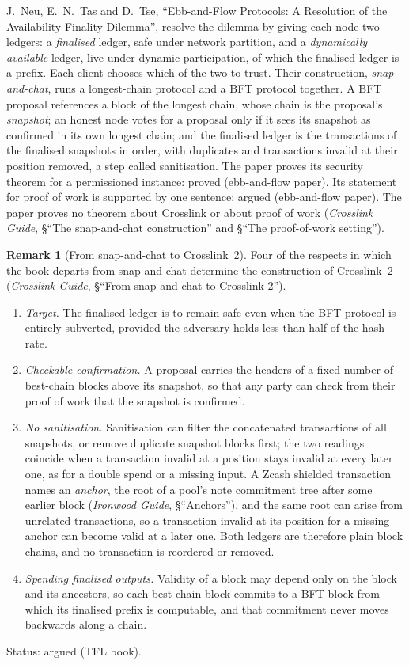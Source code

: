 \documentclass[11pt,a4paper]{article}
\theoremstyle{definition}
\newtheorem{remark}[theorem]{Remark}
\begin{document}
J.~Neu, E.~N.~Tas and D.~Tse, ``Ebb-and-Flow Protocols: A Resolution of the
Availability-Finality Dilemma'', resolve the dilemma by giving each node two
ledgers: a \emph{finalised} ledger, safe under network partition, and a
\emph{dynamically available} ledger, live under dynamic participation, of
which the finalised ledger is a prefix. Each client chooses which of the two
to trust. Their construction, \emph{snap-and-chat}, runs a longest-chain
protocol and a BFT protocol together. A BFT proposal references a block of
the longest chain, whose chain is the proposal's \emph{snapshot}; an honest
node votes for a proposal only if it sees its snapshot as confirmed in its
own longest chain; and the finalised ledger is the transactions of the
finalised snapshots in order, with duplicates and transactions invalid at
their position removed, a step called sanitisation. The paper proves its
security theorem for a permissioned instance: proved (ebb-and-flow paper).
Its statement for proof of work is supported by one sentence: argued
(ebb-and-flow paper). The paper proves no theorem about Crosslink or about
proof of work (\emph{Crosslink Guide}, \S``The snap-and-chat construction''
and \S``The proof-of-work setting'').

\begin{remark}[From snap-and-chat to Crosslink~2]\label{rem:deficiencies}
Four of the respects in which the book departs from snap-and-chat determine
the construction of Crosslink~2 (\emph{Crosslink Guide}, \S``From
snap-and-chat to Crosslink 2'').
\begin{enumerate}[label=(\arabic*)]
\item \emph{Target.} The finalised ledger is to remain safe even when the
  BFT protocol is entirely subverted, provided the adversary holds less
  than half of the hash rate.
\item \emph{Checkable confirmation.} A proposal carries the headers of a
  fixed number of best-chain blocks above its snapshot, so that any party
  can check from their proof of work that the snapshot is confirmed.
\item \emph{No sanitisation.} Sanitisation can filter the concatenated
  transactions of all snapshots, or remove duplicate snapshot blocks first;
  the two readings coincide when a transaction invalid at a position stays
  invalid at every later one, as for a double spend or a missing input. A
  Zcash shielded transaction names an \emph{anchor}, the root of a pool's
  note commitment tree after some earlier block (\emph{Ironwood Guide},
  \S``Anchors''), and the same root can arise from unrelated transactions,
  so a transaction invalid at its position for a missing anchor can become
  valid at a later one. Both ledgers are therefore plain block chains, and
  no transaction is reordered or removed.
\item \emph{Spending finalised outputs.} Validity of a block may depend only
  on the block and its ancestors, so each best-chain block commits to a BFT
  block from which its finalised prefix is computable, and that commitment
  never moves backwards along a chain.
\end{enumerate}

Status: argued (TFL book).
\end{remark}
\end{document}
